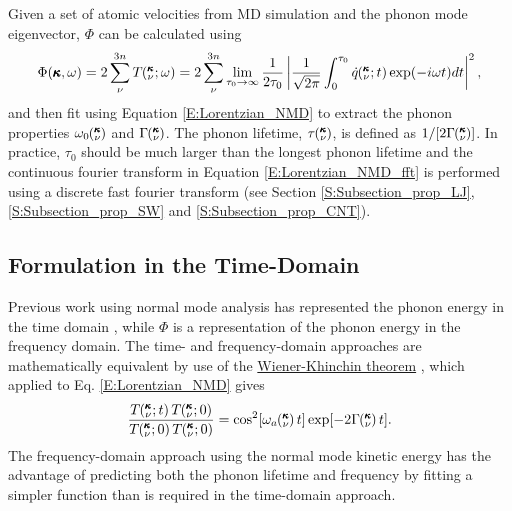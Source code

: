 Given a set of atomic velocities 
from MD simulation and the phonon mode eigenvector, $\Phi$ can be 
calculated using
\begin{equation}\label{E:Lorentzian_NMD_fft}
\begin{split}
\Phi(\pmb{\kappa},\omega) = 2\sum_{\nu}^{3n} T\mspace{-4.0mu}\left(\mspace{-8.0mu} \begin{smallmatrix}&\pmb{\kappa} \\&\nu\end{smallmatrix} \mspace{-2.0mu};\omega\right)=2\sum_{\nu}^{3n} 
\lim_{\tau_0\rightarrow\infty}\frac{1}{2\tau_0}\left|
\frac{1}{\sqrt{2\pi}}\int_{0}^{\tau_0}\dot{q}\mspace{-4.0mu}\left(\mspace{-8.0mu} \begin{smallmatrix}&\pmb{\kappa} \\&\nu\end{smallmatrix} \mspace{-2.0mu};t\right)
\exp(-i\omega t)dt\right|^2,
\end{split}
\end{equation}
and then fit using 
Equation \eqref{E:Lorentzian_NMD} to extract the phonon properties 
$\omega_0\mspace{-4.0mu}\left(\mspace{-8.0mu} \begin{smallmatrix}&\pmb{\kappa} \\&\nu\end{smallmatrix} \mspace{-3.0mu}\right)$ and $\Gamma\mspace{-4.0mu}\left(\mspace{-8.0mu} \begin{smallmatrix}&\pmb{\kappa} \\&\nu\end{smallmatrix} \mspace{-3.0mu}\right)$. 
The phonon lifetime, $\tau \mspace{-4.0mu}\left(\mspace{-8.0mu} \begin{smallmatrix}&\pmb{\kappa} \\&\nu\end{smallmatrix} \mspace{-3.0mu}\right)$, is defined as $1/[2 \Gamma \mspace{-4.0mu}\left(\mspace{-8.0mu} \begin{smallmatrix}&\pmb{\kappa} \\&\nu\end{smallmatrix} \mspace{-3.0mu}\right)]$. 
In practice, $\tau_0$ should 
be much larger than the longest phonon lifetime and the continuous 
fourier transform in 
Equation \eqref{E:Lorentzian_NMD_fft}  
is performed using a discrete fast fourier transform (see Section 
\ref{S:Subsection_prop_LJ}, 
\ref{S:Subsection_prop_SW} and \ref{S:Subsection_prop_CNT}).

\subsection{\label{S:Subsection_SED_time-domain}Formulation in the 
Time-Domain}

Previous work using normal mode analysis has represented the phonon 
energy in the time domain 
\cite{ladd_lattice_1986,mcgaughey_quantitative_2004,
henry_spectral_2008,turney_predicting_2009,
goicochea_thermal_2010,he_thermal_2011}, while $\Phi$ is a 
representation of the phonon energy in the frequency domain. The 
time- and frequency-domain 
approaches are mathematically equivalent by use of the 
\href{http://en.wikipedia.org/wiki/Wiener\%E2\%80\%93Khinchin_theorem}
{Wiener-Khinchin theorem} 
\cite{rudin_real_1987,shiomi_thermal_2011}, which applied to Eq. 
\eqref{E:Lorentzian_NMD} gives 
\begin{equation}\label{E:xcorr_NMD}
\begin{split}
\frac{T\kvt T\kvzero}{T \kvzero T\kvzero} =\cos^2[\omega_a \kv t] 
\exp[-2 \Gamma \kv t].
\end{split}
\end{equation}
The frequency-domain approach using the normal mode kinetic 
energy has the advantage of predicting both the phonon lifetime 
and frequency by fitting a simpler function than is required in the 
time-domain approach.

